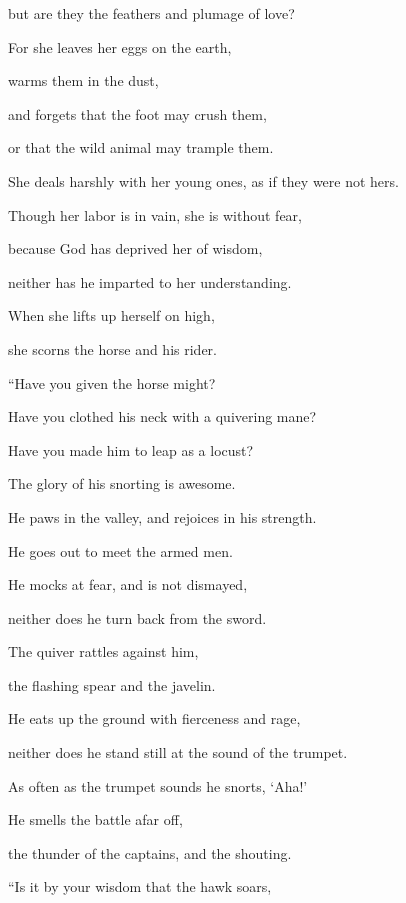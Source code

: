 {\par }{\QB but are they the feathers and plumage of love?
\par }{\Q {}For she leaves her eggs on the earth,
\par }{\QB warms them in the dust,
\par }{\Q {}and forgets that the foot may crush them,
\par }{\QB or that the wild animal may trample them.
\par }{\Q {}She deals harshly with her young ones, as if they were not hers.
\par }{\QB Though her labor is in vain, she is without fear,
\par }{\Q {}because God has deprived her of wisdom,
\par }{\QB neither has he imparted to her understanding.
\par }{\Q {}When she lifts up herself on high,
\par }{\QB she scorns the horse and his rider.
\par }{\BB \par }{\Q {}“Have you given the horse might?
\par }{\QB Have you clothed his neck with a quivering mane?
\par }{\Q {}Have you made him to leap as a locust?
\par }{\QB The glory of his snorting is awesome.
\par }{\Q {}He paws in the valley, and rejoices in his strength.
\par }{\QB He goes out to meet the armed men.
\par }{\Q {}He mocks at fear, and is not dismayed,
\par }{\QB neither does he turn back from the sword.
\par }{\Q {}The quiver rattles against him,
\par }{\QB the flashing spear and the javelin.
\par }{\Q {}He eats up the ground with fierceness and rage,
\par }{\QB neither does he stand still at the sound of the trumpet.
\par }{\Q {}As often as the trumpet sounds he snorts, ‘Aha!’
\par }{\QB He smells the battle afar off,
\par }{\QB the thunder of the captains, and the shouting.
\par }{\BB \par }{\Q {}“Is it by your wisdom that the hawk soars,
}
